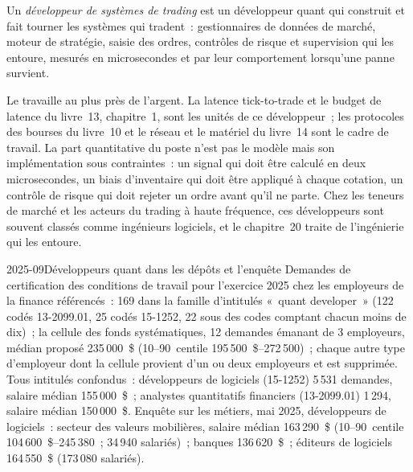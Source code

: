 \begin{definition}\label{def:in:quant-developer:trading}
Un \emph{développeur de systèmes de trading} est un développeur quant qui construit et fait tourner les systèmes
qui tradent~: gestionnaires de données de marché, moteur de stratégie, saisie des ordres, contrôles de risque et supervision qui les entoure, mesurés
en microsecondes et par leur comportement lorsqu'une panne survient.
\end{definition}

Le  travaille au plus près de l'argent. La latence tick-to-trade et le budget de latence du livre~13,
chapitre~1, sont les unités de ce développeur~; les protocoles des bourses du livre~10 et le réseau et le matériel du livre~14 sont le
cadre de travail. La part quantitative du poste n'est pas le modèle mais son implémentation sous contraintes~: un
signal qui doit être calculé en deux microsecondes, un biais d'inventaire qui doit être appliqué à chaque cotation, un contrôle de risque
qui doit rejeter un ordre avant qu'il ne parte. Chez les teneurs de marché et les acteurs du trading à haute fréquence, ces développeurs sont souvent classés comme
ingénieurs logiciels, et le chapitre~20 traite de l'ingénierie qui les entoure.

\begin{dated}{2025-09}{Développeurs quant dans les dépôts et l'enquête}\label{dat:in:quant-developer:codes}
Demandes de certification des conditions de travail pour l'exercice 2025 chez les employeurs de la finance référencés~: 169 dans la famille d'intitulés «~quant developer~» (122
codés 13-2099.01, 25 codés 15-1252, 22 sous des codes comptant chacun moins de dix)~; la cellule des fonds systématiques, 12 demandes
émanant de 3 employeurs,  médian proposé 235\,000~\$ (10--90~centile 195\,500~\$--272\,500)~; chaque autre type d'employeur
dont la cellule provient d'un ou deux employeurs et est supprimée. Tous intitulés confondus~: développeurs de logiciels (15-1252) 5\,531
demandes, salaire médian 155\,000~\$~; analystes quantitatifs financiers (13-2099.01) 1\,294, salaire médian 150\,000~\$. Enquête sur les
métiers, mai 2025, développeurs de logiciels~: secteur des valeurs mobilières, salaire médian 163\,290~\$ (10--90~centile 104\,600~\$--245\,380~; 34\,940
salariés)~; banques 136\,620~\$~; éditeurs de logiciels 164\,550~\$ (173\,080 salariés).
\end{dated}

